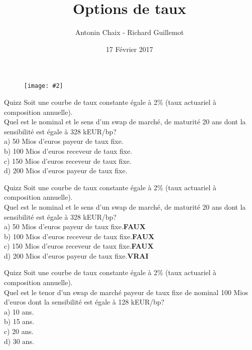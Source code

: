 \documentclass{beamer}
\title[Produits dérivés de taux]{Options de taux}
\author{Antonin Chaix - Richard Guillemot}
\institute{Master IFMA}
\date{17 Février 2017}
\newcommand{\FIG}[2]{\texttt{[image: \#2]}}
\begin{document}
\begin{frame}
\titlepage
\begin{figure}[h]
\centering \FIG{5cm}{figures/UPMC_IFMA.jpg}
\end{figure}

\end{frame}

\begin{frame}{Quizz}
Soit une courbe de taux constante égale à 2\% (taux actuariel à composition annuelle).\\
\vspace{0.5cm}
Quel est le nominal et le sens d'un swap de marché, de maturité 20 ans dont la sensibilité est égale à 328 kEUR/bp?\\
\vspace{0.5cm}
a) 50 Mios d'euros payeur de taux fixe.\\
b) 100 Mios d'euros receveur de taux fixe.\\
c) 150 Mios d'euros receveur de taux fixe.\\
d) 200 Mios d'euros payeur de taux fixe.\\
\end{frame}


\begin{frame}{Quizz}
Soit une courbe de taux constante égale à 2\% (taux actuariel à composition annuelle).\\
\vspace{0.5cm}
Quel est le nominal et le sens d'un swap de marché, de maturité 20 ans dont la sensibilité est égale à 328 kEUR/bp?\\
\vspace{0.5cm}
a) 50 Mios d'euros payeur de taux fixe.\textbf{\color{red}FAUX}\\
b) 100 Mios d'euros receveur de taux fixe.\textbf{\color{red}FAUX}\\
c) 150 Mios d'euros receveur de taux fixe.\textbf{\color{red}FAUX}\\
d) 200 Mios d'euros payeur de taux fixe.\textbf{\color{green}VRAI}\\
\end{frame}


\begin{frame}{Quizz}
Soit une courbe de taux constante égale à 2\% (taux actuariel à composition annuelle).\\
\vspace{0.5cm}
Quel est le tenor d'un swap de marché payeur de taux fixe de nominal 100 Mios d'euros dont la sensibilité est égale à 128 kEUR/bp?\\
\vspace{0.5cm}
a) 10 ans.\\
b) 15 ans.\\
c) 20 ans.\\
d) 30 ans.\\
\end{frame}
\end{document}
